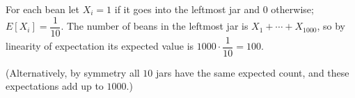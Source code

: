 For each bean let $X_i=1$ if it goes into the leftmost jar and $0$ otherwise; $E[X_i]=\dfrac{1}{10}$. The number of beans in the leftmost jar is $X_1+\cdots+X_{1000}$, so by linearity of expectation its expected value is $1000\cdot\dfrac{1}{10}=\boxed{100}$.

(Alternatively, by symmetry all $10$ jars have the same expected count, and these expectations add up to $1000$.)
